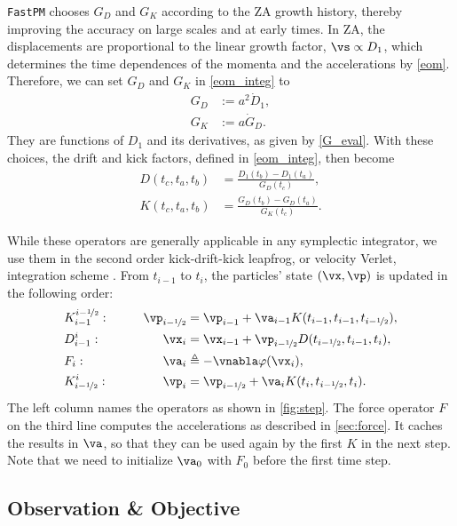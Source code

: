 \documentclass[modern, dvipsnames]{aastex631}
\newcommand{\half}{\nicefrac12}
\begin{document}
\texttt{FastPM} chooses $G_D$ and $G_K$ according to the ZA growth
history, thereby improving the accuracy on large scales and at early
times.
In ZA, the displacements are proportional to the linear growth factor,
$\vs \propto D_1$, which determines the time dependences of the momenta
and the accelerations by \eqref{eom}.
Therefore, we can set $G_D$ and $G_K$ in \eqref{eom_integ} to
%
\begin{align}
G_D &:= a^2 \dot D_1, \nonumber\\
G_K &:= a \dot G_D.
\label{G_ZA}
\end{align}
%
They are functions of $D_1$ and its derivatives, as given by
\eqref{G_eval}.
With these choices, the drift and kick factors, defined in
\eqref{eom_integ}, then become
%
\begin{align}
D(t_c, t_a, t_b) &=
  \frac{D_1(t_b) - D_1(t_a)}{G_D(t_c)}, \nonumber\\
%
K(t_c, t_a, t_b) &=
  \frac{G_D(t_b) - G_D(t_a)}{G_K(t_c)}.
\end{align}

While these operators are generally applicable in any symplectic
integrator, we use them in the second order kick-drift-kick leapfrog, or
velocity Verlet, integration scheme \citep{QuinnEtAl1997}.
From $t_{i-1}$ to $t_i$, the particles' state $(\vx, \vp)$ is updated in
the following order:
%
\begin{alignat}{2}
&K_{i-1}^{i-\half}: &\qquad \vp_{i-\half} &= \vp_{i-1}
  + \va_{i-1} K(t_{i-1}, t_{i-1}, t_{i-\half}), \nonumber\\
%
&D_{i-1}^i: & \vx_i &= \vx_{i-1}
  + \vp_{i-\half} D(t_{i-\half}, t_{i-1}, t_i), \nonumber\\
%
&F_i: & \va_i &\triangleq -\vnabla\varphi(\vx_i), \nonumber\\
%
&K_{i-\half}^i: & \vp_i &= \vp_{i-\half}
  + \va_i K(t_i, t_{i-\half}, t_i).
\label{KDFK}
\end{alignat}
%
The left column names the operators as shown in \autoref{fig:step}.
The force operator $F$ on the third line computes the accelerations as
described in \autoref{sec:force}.
It caches the results in $\va$, so that they can be used again by the
first $K$ in the next step.
Note that we need to initialize $\va_0$ with $F_0$ before the first time
step.


\vspace{1em}
\subsection{Observation \& Objective}
\label{sec:obsobj}
\end{document}
